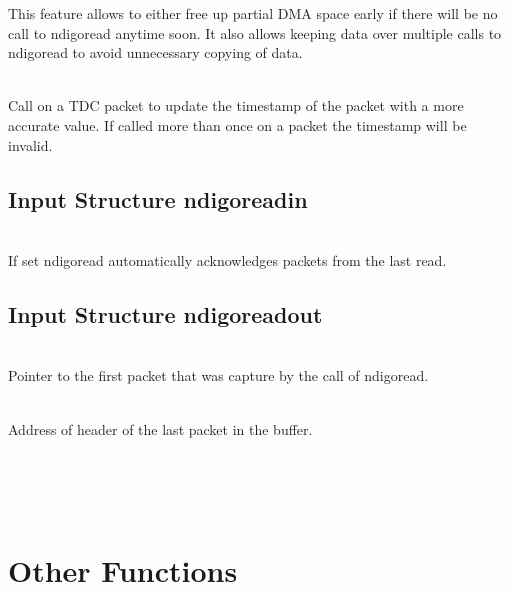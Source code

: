         This feature allows to either free up partial DMA space early if there will be no call to \textsf{ndigo\tu read} anytime soon. It also allows keeping data over multiple calls to \textsf{ndigo\tu read} to avoid unnecessary copying of data.\par

         \\
        Call on a TDC packet to update the timestamp of the packet with a more accurate value. If called more than once on a packet the timestamp will be invalid.

        \subsection{Input Structure ndigo\tu read\tu in}

            \\
            If set \textsf{ndigo\tu read} automatically acknowledges packets from the last read.

        \subsection{Input Structure ndigo\tu read\tu out}

            \\
            Pointer to the first packet that was capture by the call of \textsf{ndigo\tu read}.\par

            \\
            Address of header of the last packet in the buffer.\par

            \\
            \\
            \\
            \par


    \newpage
    \section{Other Functions}
